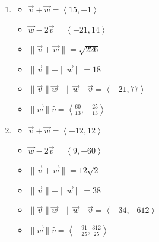 \documentclass{ximera}
\begin{document}
	\author{Stitz-Zeager}


\begin{enumerate}

\item  

 

\begin{itemize}

\item  $\overrightarrow{v} + \overrightarrow{w} = \left<15,-1 \right> $ 
\item  $\overrightarrow{w}  - 2\overrightarrow{v}  = \left<-21,14 \right>$ 

\item $\| \overrightarrow{v} + \overrightarrow{w} \| = \sqrt{226}$ 
\item  $\| \overrightarrow{v} \| + \| \overrightarrow{w}\| = 18$ 

\item $\| \overrightarrow{v} \| \overrightarrow{w} - \| \overrightarrow{w} \| \overrightarrow{v}  = \left<-21,77\right>$ 
\item $\|\overrightarrow{w}\| \hat{v}= \left<\frac{60}{13}, -\frac{25}{13} \right>$ 

\end{itemize}

 

\item  

 

\begin{itemize}

\item  $\overrightarrow{v} + \overrightarrow{w} = \left<-12,12 \right> $ 
\item  $\overrightarrow{w}  - 2\overrightarrow{v}  = \left<9,-60 \right>$ 


\item $\| \overrightarrow{v} + \overrightarrow{w} \| = 12\sqrt{2}$ 
\item  $\| \overrightarrow{v} \| + \| \overrightarrow{w}\| = 38$ 


\item $\| \overrightarrow{v} \| \overrightarrow{w} - \| \overrightarrow{w} \| \overrightarrow{v}  = \left<-34,-612\right>$ 
\item $\|\overrightarrow{w}\| \hat{v}= \left<-\frac{91}{25}, \frac{312}{25} \right>$ 


\end{itemize}
\end{enumerate}
\end{document}
